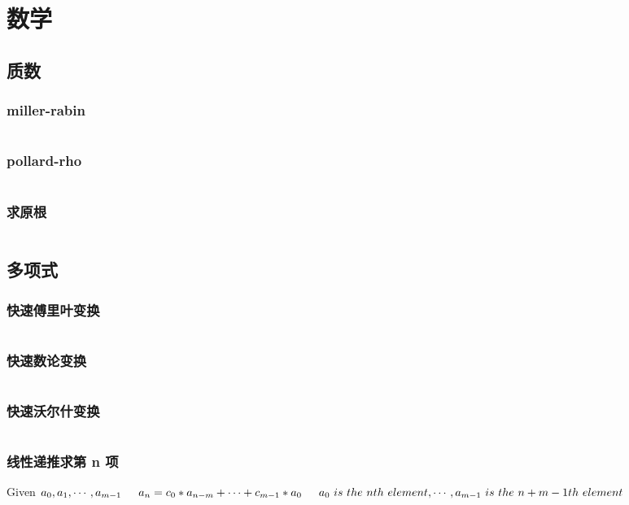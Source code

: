 \section{数学}

\subsection{质数}
\subsubsection{miller-rabin}
\inputminted[breaklines]{cpp}{math/prime/miller-rabin.cpp}
\subsubsection{pollard-rho}
\inputminted[breaklines]{cpp}{math/prime/pollard-rho.cpp}
\subsubsection{求原根}
\inputminted[breaklines]{cpp}{math/prime/get-primitive-root.cpp}

\subsection{多项式}
\subsubsection{快速傅里叶变换}
\inputminted[breaklines]{cpp}{math/polynomial/FFT.cpp}
\subsubsection{快速数论变换}
\inputminted[breaklines]{cpp}{math/polynomial/NTT.cpp}
\subsubsection{快速沃尔什变换}
\inputminted[breaklines]{cpp}{math/polynomial/FWT.cpp}
\subsubsection{线性递推求第 n 项}
Given $a_0, a_1, \cdots , a_{m-1} \\
\indent a_n = c_0 * a_{n-m} + \cdots + c_{m-1} * a_0 \\
\indent a_0 \ is \ the \ nth \ element, \cdots, a_{m-1} \ is \ the \ n+m-1th \ element
$
\inputminted[breaklines]{cpp}{math/polynomial/linear-recursion.cpp}

